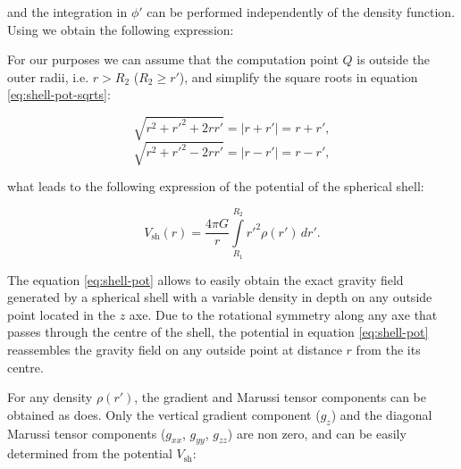 \documentclass[extra]{gji}
\begin{document}
\noindent and the integration in $\phi'$ can be performed independently of the density function.
Using \citet{sagemath} we obtain the following expression:


For our purposes we can assume that the computation point $Q$ is outside the outer radii, i.e. $r>R_2$ ($R_2 \geq r'$), and simplify the square roots in equation \ref{eq:shell-pot-sqrts}:

\begin{equation}
    \sqrt{r^2 + r'^2 + 2rr'} = |r + r'| = r + r',
\end{equation}
\begin{equation}
    \sqrt{r^2 + r'^2 - 2rr'} = |r - r'| = r - r',
\end{equation}

\noindent what leads to the following expression of the potential of the spherical shell:

\begin{equation}
    V_\text{sh}(r) = \frac{4\pi G}{r}
    \int\limits_{R_1}^{R_2} {r'}^2 \rho(r') \, dr'.
\label{eq:shell-pot}
\end{equation}

The equation \ref{eq:shell-pot} allows to easily obtain the exact gravity field generated by a spherical shell with a variable density in depth on any outside point located in the $z$ axe.
Due to the rotational symmetry along any axe that passes through the centre of the shell, the potential in equation \ref{eq:shell-pot} reassembles the gravity field on any outside point at distance $r$ from the its centre.

For any density $\rho(r')$, the gradient and Marussi tensor components can be obtained as \citet{Grombein2013} does.
Only the vertical gradient component ($g_z$) and the diagonal Marussi tensor components ($g_{xx}$, $g_{yy}$, $g_{zz}$) are non zero, and can be easily determined from the potential $V_\text{sh}$:
\end{document}

